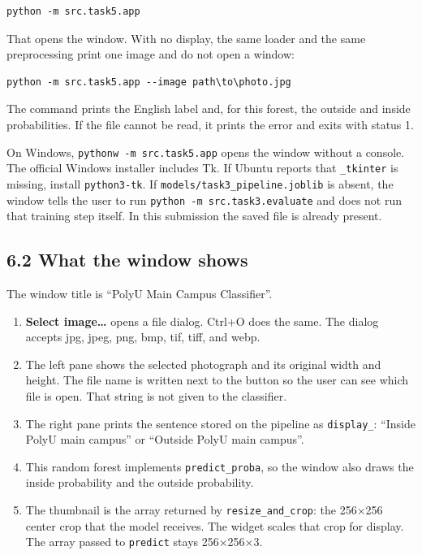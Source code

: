 \documentclass[11pt,a4paper]{article}
\providecommand{\tightlist}{%
  \setlength{\itemsep}{0pt}\setlength{\parskip}{0pt}}
\begin{document}
\begin{verbatim}
python -m src.task5.app
\end{verbatim}

That opens the window. With no display, the same loader and the same preprocessing print one image and do not open a window:

\begin{verbatim}
python -m src.task5.app --image path\to\photo.jpg
\end{verbatim}

The command prints the English label and, for this forest, the outside and inside probabilities. If the file cannot be read, it prints the error and exits with status 1.

On Windows, \texttt{pythonw\ -\allowbreak{}m\ src.task5.app} opens the window without a console. The official Windows installer includes Tk. If Ubuntu reports that \texttt{\_\allowbreak{}tkinter} is missing, install \texttt{python3-\allowbreak{}tk}. If \texttt{models/\allowbreak{}task3\_\allowbreak{}pipeline.joblib} is absent, the window tells the user to run \texttt{python\ -\allowbreak{}m\ src.task3.evaluate} and does not run that training step itself. In this submission the saved file is already present.

\subsection{6.2 What the window shows}\label{what-the-window-shows}

The window title is ``PolyU Main Campus Classifier''.

\begin{enumerate}
\def\labelenumi{\arabic{enumi}.}
\tightlist
\item
  \textbf{Select image\ldots{}} opens a file dialog. Ctrl+O does the same. The dialog accepts jpg, jpeg, png, bmp, tif, tiff, and webp.
\item
  The left pane shows the selected photograph and its original width and height. The file name is written next to the button so the user can see which file is open. That string is not given to the classifier.
\item
  The right pane prints the sentence stored on the pipeline as \texttt{display\_\allowbreak{}}: ``Inside PolyU main campus'' or ``Outside PolyU main campus''.
\item
  This random forest implements \texttt{predict\_\allowbreak{}proba}, so the window also draws the inside probability and the outside probability.
\item
  The thumbnail is the array returned by \texttt{resize\_\allowbreak{}and\_\allowbreak{}crop}: the 256×256 center crop that the model receives. The widget scales that crop for display. The array passed to \texttt{predict} stays 256×256×3.
\end{enumerate}
\end{document}
